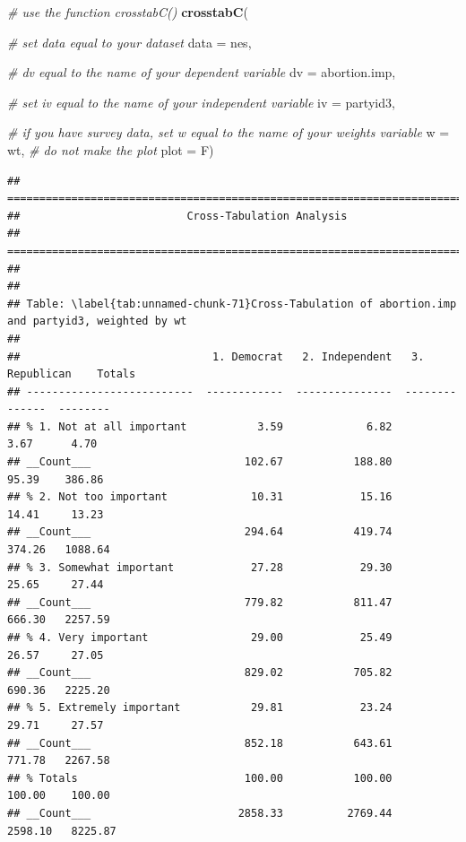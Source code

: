 \documentclass[
]{book}
\newenvironment{Shaded}{\begin{snugshade}}{\end{snugshade}}
\newcommand{\AttributeTok}[1]{\textcolor[rgb]{0.13,0.29,0.53}{#1}}
\newcommand{\CommentTok}[1]{\textcolor[rgb]{0.56,0.35,0.01}{\textit{#1}}}
\newcommand{\FunctionTok}[1]{\textcolor[rgb]{0.13,0.29,0.53}{\textbf{#1}}}
\newcommand{\NormalTok}[1]{#1}
\begin{document}
\begin{Shaded}
\begin{Highlighting}[]
\CommentTok{\# use the function \textasciigrave{}crosstabC()}
\FunctionTok{crosstabC}\NormalTok{(}
  
  \CommentTok{\# set \textasciigrave{}data\textasciigrave{} equal to your dataset}
  \AttributeTok{data =}\NormalTok{ nes,}
  
  \CommentTok{\# \textasciigrave{}dv\textasciigrave{} equal to the name of your dependent variable}
  \AttributeTok{dv =}\NormalTok{ abortion.imp, }
  
  \CommentTok{\# set \textasciigrave{}iv\textasciigrave{} equal to the name of your independent variable}
  \AttributeTok{iv =}\NormalTok{ partyid3, }
  
  \CommentTok{\# if you have survey data, set \textasciigrave{}w\textasciigrave{} equal to the name of your weights variable}
  \AttributeTok{w =}\NormalTok{ wt,}
  \CommentTok{\# do not make the plot}
  \AttributeTok{plot =}\NormalTok{ F)}
\end{Highlighting}
\end{Shaded}

\begin{verbatim}
## ===========================================================================
##                          Cross-Tabulation Analysis
## ===========================================================================
## 
## 
## Table: \label{tab:unnamed-chunk-71}Cross-Tabulation of abortion.imp and partyid3, weighted by wt
## 
##                              1. Democrat   2. Independent   3. Republican    Totals
## --------------------------  ------------  ---------------  --------------  --------
## % 1. Not at all important           3.59             6.82            3.67      4.70
## __Count___                        102.67           188.80           95.39    386.86
## % 2. Not too important             10.31            15.16           14.41     13.23
## __Count___                        294.64           419.74          374.26   1088.64
## % 3. Somewhat important            27.28            29.30           25.65     27.44
## __Count___                        779.82           811.47          666.30   2257.59
## % 4. Very important                29.00            25.49           26.57     27.05
## __Count___                        829.02           705.82          690.36   2225.20
## % 5. Extremely important           29.81            23.24           29.71     27.57
## __Count___                        852.18           643.61          771.78   2267.58
## % Totals                          100.00           100.00          100.00    100.00
## __Count___                       2858.33          2769.44         2598.10   8225.87
\end{verbatim}
\end{document}
